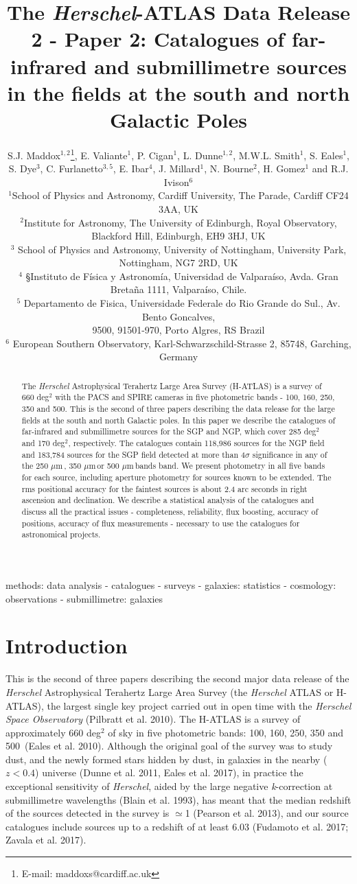 \documentclass[useAMS,usenatbib]{mnras}
\title[The \textit{Herschel}-ATLAS Data Release 2]{The
  \textit{Herschel}-ATLAS Data Release 2 - Paper 2: Catalogues of
  far-infrared and submillimetre sources in the fields at the south
  and north Galactic Poles}
\author[S.J. Maddox]{S.J. Maddox$^{1,2}$\thanks{E-mail:
    maddoxs@cardiff.ac.uk}, E. Valiante$^1$, P. Cigan$^1$, 
  L. Dunne$^{1,2}$,
  \textsc{}\newauthor M.W.L. Smith$^1$, S. Eales$^1$, S. Dye$^3$,
  C. Furlanetto$^{3,5}$, E. Ibar$^4$, \newauthor
  J. Millard$^1$, N. Bourne$^2$, H. Gomez$^1$ and R.J. Ivison$^6$\\
  $^{1}$School of Physics and Astronomy, Cardiff University, The Parade, Cardiff CF24 3AA, UK\\
  $^2$Institute for Astronomy, The University of Edinburgh, Royal
  Observatory, Blackford Hill,
  Edinburgh, EH9 3HJ, UK\\
  $^3$ School of Physics and Astronomy, University of Nottingham,
  University Park, Nottingham,
  NG7 2RD, UK\\
  $^4$ §Instituto de F\'isica y Astronom\'ia, Universidad de Valpara\'iso, Avda. Gran Breta\~na 1111, Valpara\'iso, Chile.\\
  $^5$ Departamento de Fisica, Universidade Federale do Rio Grande do Sul., Av. Bento Goncalves,\\
  9500, 91501-970, Porto Algres, RS Brazil\\
  $^6$ European Southern Observatory, Karl-Schwarzschild-Strasse 2,
  85748, Garching, Germany}
\date{}
\def\mic{ $\mu $m\,}
\begin{document}
\label{firstpage}
\pagerange{\pageref{firstpage}--\pageref{lastpage}}
\maketitle


\begin{abstract}

The {\it Herschel} Astrophysical Terahertz Large Area Survey
(H-ATLAS) is a survey of 660 deg$^2$ with the PACS and SPIRE cameras
in five photometric bands - 100, 160, 250, 350 and 500\micron.
This is the second of three papers describing the data release
for the large fields at the south and north Galactic poles.
In this paper
we describe the catalogues of far-infrared and submillimetre
sources for the SGP and NGP, which cover 285 deg$^2$ and 170 deg$^2$,
respectively.
The catalogues contain
118,986 sources for the NGP field and 183,784 sources for the
SGP field detected at
more than 4$\sigma$ significance in any of the 250\mic, 350\mic or
500\mic bands band. We present photometry in all five bands for
each source, including aperture photometry for sources known to
be extended. 
The rms positional accuracy for the faintest
sources is about 2.4 arc seconds in right ascension and
declination.
We describe a statistical analysis of the catalogues
and discuss all the practical issues - completeness, reliability,
flux boosting, accuracy of positions, accuracy of flux measurements - necessary to
use the catalogues for astronomical projects.
\end{abstract}

\begin{keywords}
methods: data analysis - catalogues - surveys - galaxies: statistics - cosmology:
observations - submillimetre: galaxies
\end{keywords}

\section{Introduction}

This is the second of three papers describing the second major data release of the
{\it Herschel} Astrophysical Terahertz Large Area Survey (the {\it Herschel}
ATLAS or H-ATLAS), the largest single key project carried out
in open time with the {\it Herschel Space Observatory} (Pilbratt et al.
2010).
The H-ATLAS is a survey of approximately 660 deg$^2$ of sky
in five photometric bands: 100, 160, 250, 350 and 500\micron\ (Eales et al.
2010).
Although the original goal of the survey was to study dust, and the newly formed
stars hidden by dust,
in galaxies in the nearby ($z<0.4$) universe (Dunne et al. 2011,
Eales et al. 2017), in practice the
exceptional sensitivity of {\it Herschel}, aided by
the large negative {\it k}-correction at submillimetre wavelengths
(Blain et al. 1993), has meant that the median 
redshift of the sources detected in the survey is $\simeq$1 (Pearson et
al. 2013), and our source catalogues
include sources up to a redshift of at least 6.03 (Fudamoto et al. 2017;
Zavala et al. 2017).
\end{document}
